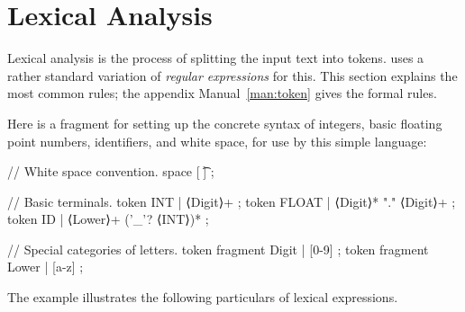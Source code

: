 \documentclass[11pt]{article} %
\begin{document}
\section{Lexical Analysis}
\label{sec:tokens}

Lexical analysis is the process of splitting the input text into tokens. \HAX uses a rather standard
variation of \emph{regular expressions} for this. This section explains the most common rules; the
appendix Manual~\ref{man:token} gives the formal rules.

\begin{example}\label{ex:lexical}
  Here is a \HAX fragment for setting up the concrete syntax of integers, basic floating point
  numbers, identifiers, and white space, for use by this simple language:
  \begin{hacs}[xleftmargin=\parindent,numbers=right,texcl]
// White space convention.
space [ \t\n] ;

// Basic terminals.
token INT  | ⟨Digit⟩+ ;
token FLOAT  | ⟨Digit⟩* "." ⟨Digit⟩+ ;
token ID  | ⟨Lower⟩+ ('_'? ⟨INT⟩)* ;

// Special categories of letters.
token fragment Digit  | [0-9] ;
token fragment Lower  | [a-z] ;
  \end{hacs}
\end{example}

The example illustrates the following particulars of \HAX lexical expressions.
\end{document}
